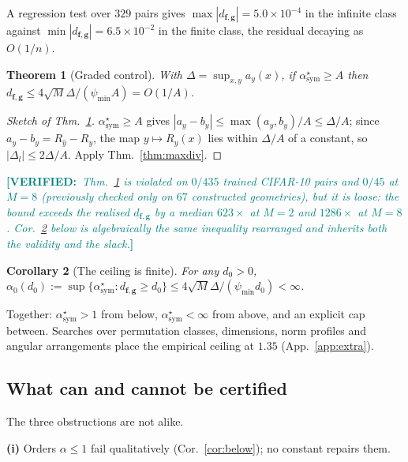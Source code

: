 \documentclass[10pt,letterpaper,twocolumn]{article}
\newcommand{\DONE}[1]{\textcolor{teal}{\small\textbf{[VERIFIED:}~\textit{#1}\textbf{]}}}
\newcommand{\bff}{\mathbf{f}}
\newcommand{\bfg}{\mathbf{g}}
\newcommand{\dfg}{d_{\bff,\bfg}}
\theoremstyle{plain}
\newtheorem{theorem}{Theorem}
\newtheorem{corollary}[theorem]{Corollary}
\theoremstyle{definition}
\theoremstyle{remark}
\begin{document}
A regression test over $329$ pairs gives
$\max|\dfg|=5.0\times10^{-4}$ in the infinite class against
$\min|\dfg|=6.5\times10^{-2}$ in the finite class, the residual decaying as
$O(1/n)$.

\begin{theorem}[Graded control]
\label{thm:graded}
With $\Delta=\sup_{x,y}a_{y}(x)$, if $\alpha^{\star}_{\mathrm{sym}}\ge A$ then
$\dfg\le4\sqrt{M}\Delta/(\psi_{\min}A)=O(1/A)$.
\end{theorem}

\begin{proof}[Sketch of Thm.~\ref{thm:graded}]
$\alpha^{\star}_{\mathrm{sym}}\ge A$ gives
$|a_{y}-b_{y}|\le\max(a_{y},b_{y})/A\le\Delta/A$; since
$a_{y}-b_{y}=R_{\hat y}-R_{y}$, the map $y\mapsto R_{y}(x)$ lies within
$\Delta/A$ of a constant, so $|\Delta_{l}|\le2\Delta/A$. Apply
Thm.~\ref{thm:maxdiv}.
\end{proof}

\DONE{Thm.~\ref{thm:graded} is violated on $0/435$ trained CIFAR-10 pairs
and $0/45$ at $M{=}8$ (previously checked only on $67$ constructed
geometries), but it is loose: the bound exceeds the realised $\dfg$ by a median
$623\times$ at $M{=}2$ and $1286\times$ at $M{=}8$. Cor.~\ref{cor:ceiling} below is algebraically the same inequality
rearranged and inherits both the validity and the slack.}

\begin{corollary}[The ceiling is finite]
\label{cor:ceiling}
For any $d_{0}>0$,
$\alpha_{0}(d_{0}):=\sup\{\alpha^{\star}_{\mathrm{sym}}:\dfg\ge d_{0}\}
\le4\sqrt{M}\Delta/(\psi_{\min}d_{0})<\infty$.
\end{corollary}

Together: $\alpha^{\star}_{\mathrm{sym}}>1$ from below,
$\alpha^{\star}_{\mathrm{sym}}<\infty$ from above, and an explicit cap between.
Searches over permutation classes, dimensions, norm profiles and angular
arrangements place the empirical ceiling at $1.35$ (App.~\ref{app:extra}).

\subsection{What can and cannot be certified}
\label{sec:cannot}

The three obstructions are not alike.

\textbf{(i)} Orders $\alpha\le1$ fail qualitatively (Cor.~\ref{cor:below}); no
constant repairs them.
\end{document}
